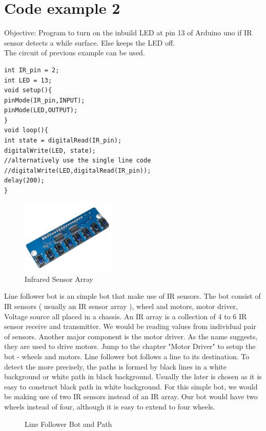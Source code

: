 \section{\textbf{Code example 2}}
Objective: Program to turn on the inbuild LED at pin 13 of Arduino uno if IR sensor detects a while surface. Else keeps the LED off. \\
The circuit of previous example can be used.
\vspace{0.2cm}
\begin{lstlisting}[style=CStyle]
int IR_pin = 2;
int LED = 13;
void setup(){
pinMode(IR_pin,INPUT);
pinMode(LED,OUTPUT);
}
void loop(){
int state = digitalRead(IR_pin);
digitalWrite(LED, state);
//alternatively use the single line code
//digitalWrite(LED,digitalRead(IR_pin));
delay(200);
}
\end{lstlisting}
\begin{figure}[h!]	
	\centering
	\includegraphics[width=1.8in]{Chapters/images/IR_array.png}
	\caption{Infrared Sensor Array}
\end{figure}
Line follower bot is an simple bot that make use of IR sensors. The bot consist of IR sensors ( usually an IR sensor array ), wheel and motors, motor driver, Voltage source all placed in a chassis. An IR array is a collection of 4 to 6 IR sensor receive and transmitter. We would be reading values from individual pair of sensors. Another major component is the motor driver. As the name suggests, they are used to drive motors. Jump to the chapter "Motor Driver" to setup the bot - wheels and motors. Line follower bot follows a line to its destination. To detect the more precisely, the paths is formed by black lines in a white background or white path in black background. Usually the later is chosen as it is easy to construct black path in white background. For this simple bot, we would be making use of two IR sensors instead of an IR array. Our bot would have two wheels instead of four, although it is easy to extend to four wheels.
\begin{figure}
    \hspace{0.2cm}
    \qquad
    \caption{Line Follower Bot and Path}
\end{figure}
